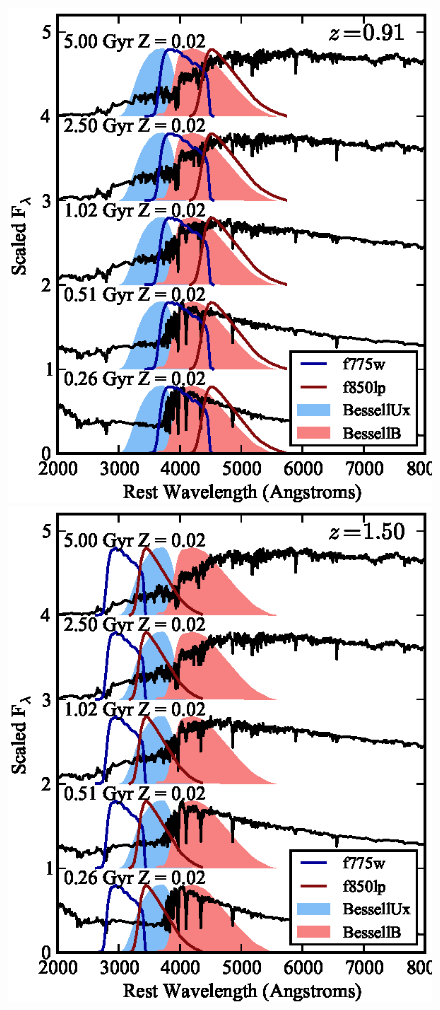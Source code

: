 \begin{figure}[t]
\begin{center}
\includegraphics{figures/clrate/bc03spectra_lowz.eps}%
\includegraphics{figures/clrate/bc03spectra_highz.eps}

\end{center}
\end{figure}

